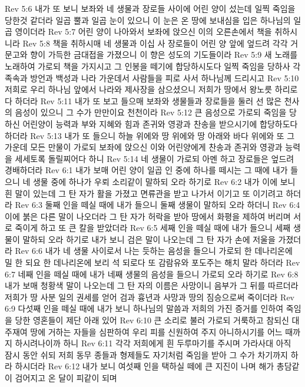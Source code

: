 Rev 5:6  내가 또 보니 보좌와 네 생물과 장로들 사이에 어린 양이 섰는데 일찍 죽임을 당한것 같더라 일곱 뿔과 일곱 눈이 있으니 이 눈은 온 땅에 보내심을 입은 하나님의 일곱 영이더라
Rev 5:7  어린 양이 나아와서 보좌에 앉으신 이의 오른손에서 책을 취하시니라
Rev 5:8  책을 취하시매 네 생물과 이십 사 장로들이 어린 양 앞에 엎드려 각각 거문고와 향이 가득한 금대접을 가졌으니 이 향은 성도의 기도들이라
Rev 5:9  새 노래를 노래하여 가로되 책을 가지시고 그 인봉을 떼기에 합당하시도다 일찍 죽임을 당하사 각 족속과 방언과 백성과 나라 가운데서 사람들을 피로 사서 하나님께 드리시고
Rev 5:10  저희로 우리 하나님 앞에서 나라와 제사장을 삼으셨으니 저희가 땅에서 왕노릇 하리로다 하더라
Rev 5:11  내가 또 보고 들으매 보좌와 생물들과 장로들을 둘러 선 많은 천사의 음성이 있으니 그 수가 만만이요 천천이라
Rev 5:12  큰 음성으로 가로되 죽임을 당하신 어린양이 능력과 부와 지혜와 힘과 존귀와 영광과 찬송을 받으시기에 합당하도다 하더라
Rev 5:13  내가 또 들으니 하늘 위에와 땅 위에와 땅 아래와 바다 위에와 또 그 가운데 모든 만물이 가로되 보좌에 앉으신 이와 어린양에게 찬송과 존귀와 영광과 능력을 세세토록 돌릴찌어다 하니
Rev 5:14  네 생물이 가로되 아멘 하고 장로들은 엎드려 경배하더라
Rev 6:1  내가 보매 어린 양이 일곱 인 중에 하나를 떼시는 그 때에 내가 들으니 네 생물 중에 하나가 우뢰 소리같이 말하되 오라 하기로
Rev 6:2  내가 이에 보니 흰 말이 있는데 그 탄 자가 활을 가졌고 면류관을 받고 나가서 이기고 또 이기려고 하더라
Rev 6:3  둘째 인을 떼실 때에 내가 들으니 둘째 생물이 말하되 오라 하더니
Rev 6:4  이에 붉은 다른 말이 나오더라 그 탄 자가 허락을 받아 땅에서 화평을 제하여 버리며 서로 죽이게 하고 또 큰 칼을 받았더라
Rev 6:5  세째 인을 떼실 때에 내가 들으니 세째 생물이 말하되 오라 하기로 내가 보니 검은 말이 나오는데 그 탄 자가 손에 저울을 가졌더라
Rev 6:6  내가 네 생물 사이로서 나는 듯하는 음성을 들으니 가로되 한 데나리온에 밀 한 되요 한 데나리온에 보리 석 되로다 또 감람유와 포도주는 해치 말라 하더라
Rev 6:7  네째 인을 떼실 때에 내가 네째 생물의 음성을 들으니 가로되 오라 하기로
Rev 6:8  내가 보매 청황색 말이 나오는데 그 탄 자의 이름은 사망이니 음부가 그 뒤를 따르더라 저희가 땅 사분 일의 권세를 얻어 검과 흉년과 사망과 땅의 짐승으로써 죽이더라
Rev 6:9  다섯째 인을 떼실 때에 내가 보니 하나님의 말씀과 저희의 가진 증거를 인하여 죽임을 당한 영혼들이 제단 아래 있어
Rev 6:10  큰 소리로 불러 가로되 거룩하고 참되신 대주재여 땅에 거하는 자들을 심판하여 우리 피를 신원하여 주지 아니하시기를 어느 때까지 하시려나이까 하니
Rev 6:11  각각 저희에게 흰 두루마기를 주시며 가라사대 아직 잠시 동안 쉬되 저희 동무 종들과 형제들도 자기처럼 죽임을 받아 그 수가 차기까지 하라 하시더라
Rev 6:12  내가 보니 여섯째 인을 택하실 떼에 큰 지진이 나며 해가 총담같이 검어지고 온 달이 피같이 되며
